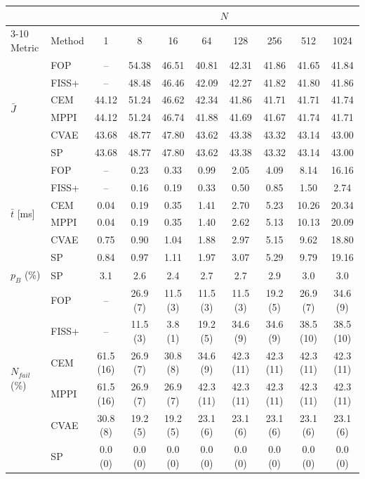 \begin{tabular}{llcccccccc}
\toprule
& & \multicolumn{8}{c}{$N$} \\
\cmidrule(lr){3-10}
Metric & Method & 1 & 8 & 16 & 64 & 128 & 256 & 512 & 1024 \\
\midrule
\multirow{6}{*}{$\bar{J}$} & FOP & -- & 54.38 & 46.51 & 40.81 & 42.31 & 41.86 & 41.65 & 41.84 \\
 & FISS+ & -- & 48.48 & 46.46 & 42.09 & 42.27 & 41.82 & 41.80 & 41.86 \\
 & CEM & 44.12 & 51.24 & 46.62 & 42.34 & 41.86 & 41.71 & 41.71 & 41.74 \\
 & MPPI & 44.12 & 51.24 & 46.74 & 41.88 & 41.69 & 41.67 & 41.74 & 41.71 \\
 & CVAE & 43.68 & 48.77 & 47.80 & 43.62 & 43.38 & 43.32 & 43.14 & 43.00 \\
 & SP & 43.68 & 48.77 & 47.80 & 43.62 & 43.38 & 43.32 & 43.14 & 43.00 \\
\midrule
\multirow{6}{*}{$\bar{t}$ [ms]} & FOP & -- & 0.23 & 0.33 & 0.99 & 2.05 & 4.09 & 8.14 & 16.16 \\
 & FISS+ & -- & 0.16 & 0.19 & 0.33 & 0.50 & 0.85 & 1.50 & 2.74 \\
 & CEM & 0.04 & 0.19 & 0.35 & 1.41 & 2.70 & 5.23 & 10.26 & 20.34 \\
 & MPPI & 0.04 & 0.19 & 0.35 & 1.40 & 2.62 & 5.13 & 10.13 & 20.09 \\
 & CVAE & 0.75 & 0.90 & 1.04 & 1.88 & 2.97 & 5.15 & 9.62 & 18.80 \\
 & SP & 0.84 & 0.97 & 1.11 & 1.97 & 3.07 & 5.29 & 9.79 & 19.16 \\
\midrule
\multirow{1}{*}{$p_{B}$ (\%)} & SP & 3.1 & 2.6 & 2.4 & 2.7 & 2.7 & 2.9 & 3.0 & 3.0 \\
\midrule
\multirow{6}{*}{$N_{fail}$ (\%)} & FOP & -- & 26.9 (7) & 11.5 (3) & 11.5 (3) & 11.5 (3) & 19.2 (5) & 26.9 (7) & 34.6 (9) \\
 & FISS+ & -- & 11.5 (3) & 3.8 (1) & 19.2 (5) & 34.6 (9) & 34.6 (9) & 38.5 (10) & 38.5 (10) \\
 & CEM & 61.5 (16) & 26.9 (7) & 30.8 (8) & 34.6 (9) & 42.3 (11) & 42.3 (11) & 42.3 (11) & 42.3 (11) \\
 & MPPI & 61.5 (16) & 26.9 (7) & 26.9 (7) & 42.3 (11) & 42.3 (11) & 42.3 (11) & 42.3 (11) & 42.3 (11) \\
 & CVAE & 30.8 (8) & 19.2 (5) & 19.2 (5) & 23.1 (6) & 23.1 (6) & 23.1 (6) & 23.1 (6) & 23.1 (6) \\
 & SP & 0.0 (0) & 0.0 (0) & 0.0 (0) & 0.0 (0) & 0.0 (0) & 0.0 (0) & 0.0 (0) & 0.0 (0) \\
\bottomrule
\end{tabular}

